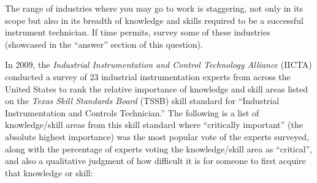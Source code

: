 
The range of industries where you may go to work is staggering, not only in its scope but also in its breadth of knowledge and skills required to be a successful instrument technician.  If time permits, survey some of these industries (showcased in the ``answer'' section of this question).

\vskip 10pt

In 2009, the {\it Industrial Instrumentation and Control Technology Alliance} (IICTA) conducted a survey of 23 industrial instrumentation experts from across the United States to rank the relative importance of knowledge and skill areas listed on the {\it Texas Skill Standards Board} (TSSB) skill standard for ``Industrial Instrumentation and Controls Technician.''  The following is a list of knowledge/skill areas from this skill standard where ``critically important'' (the absolute highest importance) was the most popular vote of the experts surveyed, along with the percentage of experts voting the knowledge/skill area as ``critical'', and also a qualitative judgment of how difficult it is for someone to first acquire that knowledge or skill:


